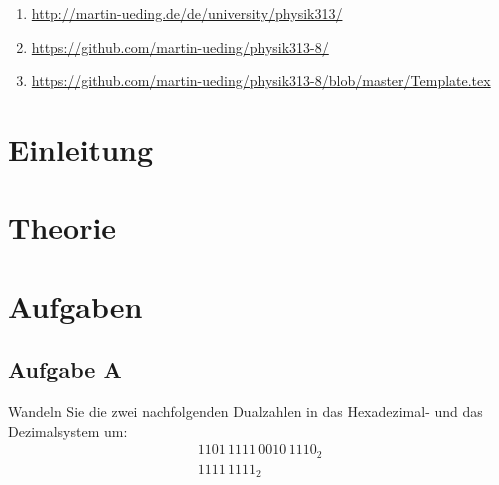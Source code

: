 \begin{enumerate}
	\item
		\label{it:mu}
		\url{http://martin-ueding.de/de/university/physik313/}
	\item
		\label{it:github/alles}
		\url{https://github.com/martin-ueding/physik313-8/}
	\item
		\label{it:github/template}
		\url{https://github.com/martin-ueding/physik313-8/blob/master/Template.tex}
\end{enumerate}

\newpage
\tableofcontents
\newpage


\FloatBarrier
\section{Einleitung}


\FloatBarrier
\section{Theorie}


\FloatBarrier
\section{Aufgaben}

\subsection{Aufgabe A}

\begin{problem}
	Wandeln Sie die zwei nachfolgenden Dualzahlen in das Hexadezimal- und das
	Dezimalsystem um:
	\begin{gather*}
		1101\,1111\,0010\,1110_2 \\
		1111\,1111_2
	\end{gather*}
\end{problem}


